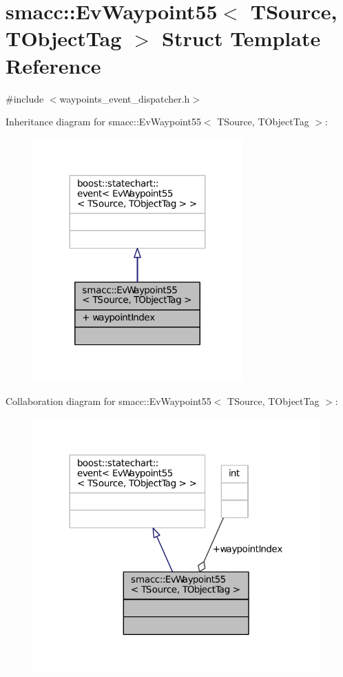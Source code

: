 \hypertarget{structsmacc_1_1EvWaypoint55}{}\section{smacc\+:\+:Ev\+Waypoint55$<$ T\+Source, T\+Object\+Tag $>$ Struct Template Reference}
\label{structsmacc_1_1EvWaypoint55}


{\ttfamily \#include $<$waypoints\+\_\+event\+\_\+dispatcher.\+h$>$}



Inheritance diagram for smacc\+:\+:Ev\+Waypoint55$<$ T\+Source, T\+Object\+Tag $>$\+:
\nopagebreak
\begin{figure}[H]
\begin{center}
\leavevmode
\includegraphics[width=227pt]{structsmacc_1_1EvWaypoint55__inherit__graph}
\end{center}
\end{figure}


Collaboration diagram for smacc\+:\+:Ev\+Waypoint55$<$ T\+Source, T\+Object\+Tag $>$\+:
\nopagebreak
\begin{figure}[H]
\begin{center}
\leavevmode
\includegraphics[width=312pt]{structsmacc_1_1EvWaypoint55__coll__graph}
\end{center}
\end{figure}
